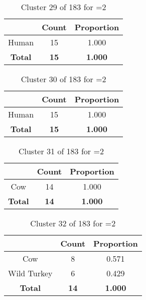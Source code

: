 \begin{table}[ht!]
\centering
\begin{tabular}{|c|c|c|}
\hline
\bf \Spec{} &\bf Count &\bf Proportion\\ \hline \hline
Human & 15 & 1.000\\ \hline
\hline
\bf Total & \bf 15 & \bf 1.000\\ \hline
\end{tabular}
\label{tab:cluster:29:2}
\caption{Cluster 29 of 183 for \minneigh{}=2}
\end{table}

\clearpage
\begin{table}[ht!]
\centering
\begin{tabular}{|c|c|c|}
\hline
\bf \Spec{} &\bf Count &\bf Proportion\\ \hline \hline
Human & 15 & 1.000\\ \hline
\hline
\bf Total & \bf 15 & \bf 1.000\\ \hline
\end{tabular}
\label{tab:cluster:30:2}
\caption{Cluster 30 of 183 for \minneigh{}=2}
\end{table}

\begin{table}[ht!]
\centering
\begin{tabular}{|c|c|c|}
\hline
\bf \Spec{} &\bf Count &\bf Proportion\\ \hline \hline
Cow & 14 & 1.000\\ \hline
\hline
\bf Total & \bf 14 & \bf 1.000\\ \hline
\end{tabular}
\label{tab:cluster:31:2}
\caption{Cluster 31 of 183 for \minneigh{}=2}
\end{table}

\begin{table}[ht!]
\centering
\begin{tabular}{|c|c|c|}
\hline
\bf \Spec{} &\bf Count &\bf Proportion\\ \hline \hline
Cow & 8 & 0.571\\ \hline
Wild Turkey & 6 & 0.429\\ \hline
\hline
\bf Total & \bf 14 & \bf 1.000\\ \hline
\end{tabular}
\label{tab:cluster:32:2}
\caption{Cluster 32 of 183 for \minneigh{}=2}
\end{table}

